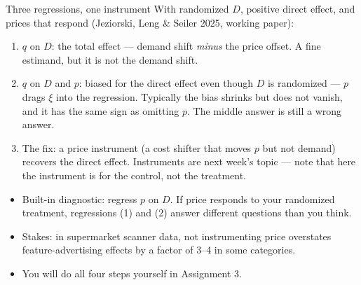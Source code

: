 \documentclass[aspectratio=169,11pt]{beamer}
\begin{document}
\begin{frame}{Three regressions, one instrument}
With randomized $D$, positive direct effect, and prices that respond
(Jeziorski, Leng \& Seiler 2025, working paper):
\begin{enumerate}
	\item $q$ on $D$: the \alert{total} effect --- demand shift \emph{minus} the price
	offset. A fine estimand, but it is not the demand shift.

	\item $q$ on $D$ and $p$: \alert{biased for the direct effect even though $D$ is
	randomized} --- $p$ drags $\xi$ into the regression. Typically the bias shrinks
	but does not vanish, and it has the same sign as omitting $p$. The middle answer
	is still a wrong answer.

	\item The fix: a \alert{price instrument} (a cost shifter that moves $p$ but not
	demand) recovers the direct effect. Instruments are next week's topic --- note
	that here the instrument is for the \alert{control}, not the treatment.
\end{enumerate}
\medskip
\begin{itemize}
	\item Built-in diagnostic: regress $p$ on $D$. If price responds to your
	randomized treatment, regressions (1) and (2) answer different questions than
	you think.
	\item Stakes: in supermarket scanner data, not instrumenting price overstates
	feature-advertising effects by a factor of 3--4 in some categories.
	\item You will do all four steps yourself in Assignment 3.
\end{itemize}
\end{frame}
\end{document}
